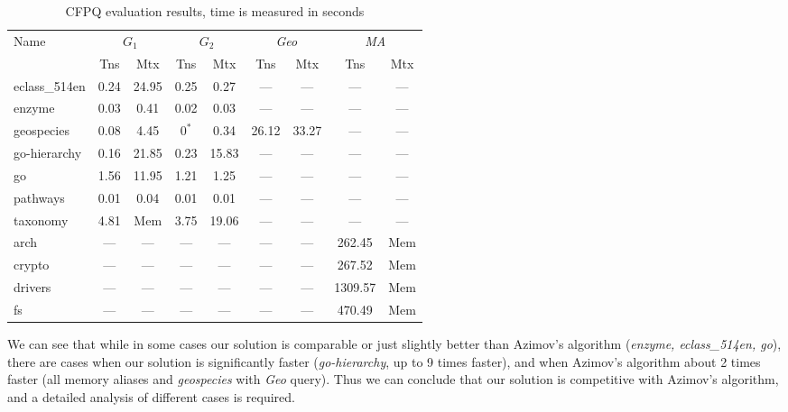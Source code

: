 {\setlength{\tabcolsep}{0.2em}
\begin{table}[H]
\caption{CFPQ evaluation results, time is measured in seconds}
\label{tbl:CFPQ_index}
    \small
    \begin{tabular}{| l | c | c | c | c | c | c | c | c |}
      \hline

      \multirow{2}{*}{Name}  & \multicolumn{2}{c|}{$G_1$} & \multicolumn{2}{c|}{$G_2$} & \multicolumn{2}{c|}{\textit{Geo}} & \multicolumn{2}{c|}{\textit{MA}}\\
      \cline{2-9}
                      & Tns    & Mtx    & Tns  & Mtx  & Tns   & Mtx   & Tns     & Mtx \\
      \hline
      \hline
      eclass\_514en   & 0.24   & 24.95   & 0.25 & 0.27   & ---   & ---   & ---     & ---\\
      enzyme          & 0.03   & 0.41    & 0.02 & 0.03   & ---   & ---   & ---     & ---\\
      geospecies      & 0.08   & 4.45    & $0^{*}$ & 0.34 & 26.12 & 33.27 & ---     & ---\\
      go-hierarchy    & 0.16   & 21.85   & 0.23 & 15.83  & ---   & ---   & ---     & ---\\
      go              & 1.56   & 11.95   & 1.21 & 1.25   & ---   & ---   & ---     & ---\\
      pathways        & 0.01   & 0.04    & 0.01 & 0.01   & ---   & ---   & ---     & ---\\
      taxonomy        & 4.81   & Mem     & 3.75 & 19.06  & ---   & ---   & ---     & ---\\
      \hline
      arch            & ---    & ---    & ---  & ---  & ---   & ---   & 262.45  & Mem  \\
      crypto          & ---    & ---    & ---  & ---  & ---   & ---   & 267.52  & Mem  \\
      drivers         & ---    & ---    & ---  & ---  & ---   & ---   & 1309.57 & Mem \\
      fs              & ---    & ---    & ---  & ---  & ---   & ---   & 470.49  & Mem  \\
      \hline
    \end{tabular}
  \end{table}
}

We can see that while in some cases our solution is comparable or just slightly better than Azimov's algorithm (\textit{enzyme, eclass\_514en, go}), there are cases when our solution is significantly faster (\textit{go-hierarchy}, up to 9 times faster), and when Azimov's algorithm about 2 times faster (all memory aliases and \textit{geospecies} with \textit{Geo} query).
Thus we can conclude that our solution is competitive with Azimov's algorithm, and a detailed analysis of different cases is required.

